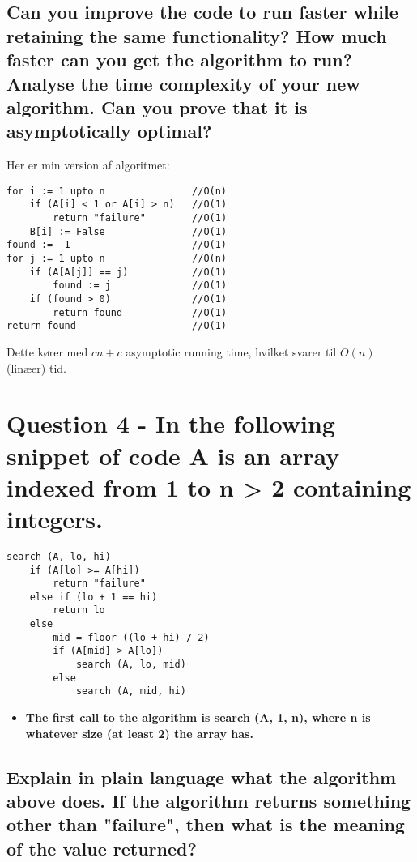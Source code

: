 \documentclass[a4paper,12pt]{article}
\begin{document}
\subsection[]{Can you improve the code to run faster while retaining the same functionality? How
much faster can you get the algorithm to run? Analyse the time complexity of your new
algorithm. Can you prove that it is asymptotically optimal?}

Her er min version af algoritmet:
\begin{lstlisting}
for i := 1 upto n               //O(n)
    if (A[i] < 1 or A[i] > n)   //O(1)
        return "failure"        //O(1)
    B[i] := False               //O(1)
found := -1                     //O(1)
for j := 1 upto n               //O(n)
    if (A[A[j]] == j)           //O(1)
        found := j              //O(1)
    if (found > 0)              //O(1)
        return found            //O(1)
return found                    //O(1)
\end{lstlisting}
Dette kører med $cn + c$ asymptotic running time, hvilket svarer til $O(n)$ (linæer) tid.

\section[Question 4]{Question 4 - In the following snippet of code A is an array indexed from 1 to n > 2 containing integers.}

\begin{lstlisting}
search (A, lo, hi)
    if (A[lo] >= A[hi])
        return "failure"
    else if (lo + 1 == hi)
        return lo
    else 
        mid = floor ((lo + hi) / 2)
        if (A[mid] > A[lo])
            search (A, lo, mid)
        else
            search (A, mid, hi)
\end{lstlisting}

\begin{itemize}
    \item[] \textbf{The first call to the algorithm is search (A, 1, n), where n is whatever size (at least 2) the
    array has.}
\end{itemize}

\subsection[]{Explain in plain language what the algorithm above does. If the algorithm returns something other than "failure", then what is the meaning of the value returned?}
    
\end{document}
